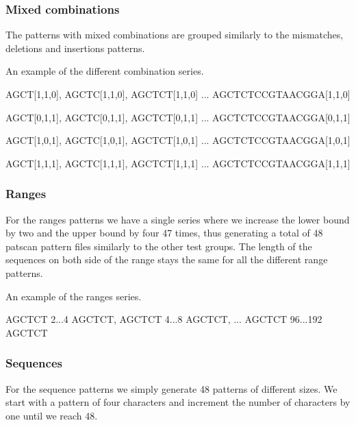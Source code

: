 \documentclass[12pt]{article}
\theoremstyle{definition}
\begin{document}
\subsubsection{Mixed combinations}
The patterns with mixed combinations are grouped similarly to the mismatches, deletions and insertions patterns.

\begin{example}
An example of the different combination series.

\begin{center}
AGCT[1,1,0], AGCTC[1,1,0], AGCTCT[1,1,0] ... AGCTCTCCGTAACGGA[1,1,0]
\vspace{0.3cm}

AGCT[0,1,1], AGCTC[0,1,1], AGCTCT[0,1,1] ... AGCTCTCCGTAACGGA[0,1,1]
\vspace{0.3cm}

AGCT[1,0,1], AGCTC[1,0,1], AGCTCT[1,0,1] ... AGCTCTCCGTAACGGA[1,0,1]
\vspace{0.3cm}

AGCT[1,1,1], AGCTC[1,1,1], AGCTCT[1,1,1] ... AGCTCTCCGTAACGGA[1,1,1]
\end{center}

\end{example}

\subsubsection{Ranges}

For the ranges patterns we have a single series where we increase the lower bound by two and the upper bound by four 47 times, thus generating a total of 48 patscan pattern files similarly to the other test groups. The length of the sequences on both side of the range stays the same for all the different range patterns.

\begin{example}
An example of the ranges series.

\begin{center}
AGCTCT 2...4 AGCTCT, AGCTCT 4...8 AGCTCT, ... AGCTCT 96...192 AGCTCT
\end{center}
\end{example}

\subsubsection{Sequences}

For the sequence patterns we simply generate 48 patterns of different sizes. We start with a pattern of four characters and increment the number of characters by one until we reach 48.
\end{document}

